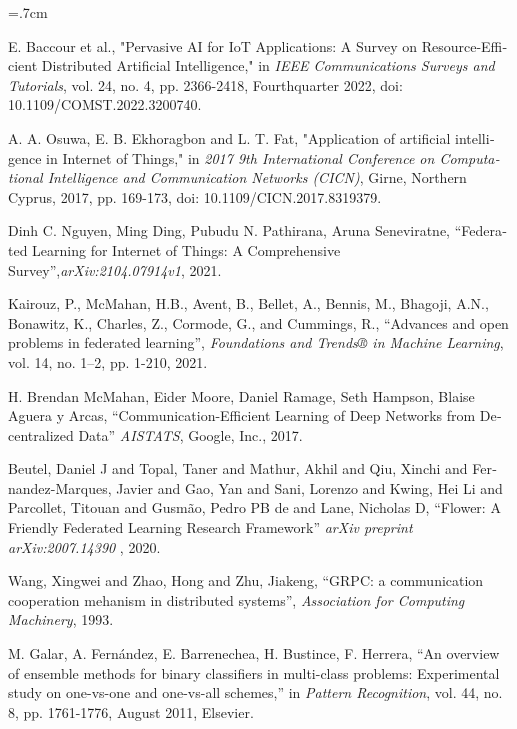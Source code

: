\renewcommand{\bibname}{مراجع}

\begin{thebibliography}{99}

\begin{latin}

\baselineskip=.7cm

E. Baccour et al., "Pervasive AI for IoT Applications: A Survey on Resource-Efficient Distributed Artificial Intelligence," in \textit{IEEE Communications Surveys and Tutorials}, vol. 24, no. 4, pp. 2366-2418, Fourthquarter 2022, doi: 10.1109/COMST.2022.3200740.

A. A. Osuwa, E. B. Ekhoragbon and L. T. Fat, "Application of artificial intelligence in Internet of Things," in \textit{2017 9th International Conference on Computational Intelligence and Communication Networks (CICN)}, Girne, Northern Cyprus, 2017, pp. 169-173, doi: 10.1109/CICN.2017.8319379.

Dinh C. Nguyen, Ming Ding, Pubudu N. Pathirana, Aruna Seneviratne, “Federated Learning for Internet of Things:
A Comprehensive Survey”,\textit{arXiv:2104.07914v1}, 2021.

Kairouz, P., McMahan, H.B., Avent, B., Bellet, A., Bennis, M., Bhagoji, A.N., Bonawitz,
K., Charles, Z., Cormode, G., and Cummings, R., “Advances and open problems in federated
learning”, \textit{Foundations and Trends® in Machine Learning}, vol. 14, no. 1–2, pp. 1-210, 2021.

\noindent H. Brendan McMahan, Eider Moore, Daniel Ramage, Seth Hampson, Blaise Aguera y Arcas, “Communication-Efficient Learning of Deep Networks from Decentralized Data” \textit{AISTATS}, Google, Inc., 2017.

Beutel, Daniel J and Topal, Taner and Mathur, Akhil and Qiu, Xinchi and Fernandez-Marques, Javier and Gao, Yan and Sani, Lorenzo and Kwing, Hei Li and Parcollet, Titouan and Gusmão, Pedro PB de and Lane, Nicholas D, “Flower: A Friendly Federated Learning Research Framework” \textit{arXiv preprint arXiv:2007.14390}
, 2020.

Wang, Xingwei and Zhao, Hong and Zhu, Jiakeng, “GRPC: a communication cooperation mehanism in distributed systems”,  \textit{Association for Computing Machinery}, 1993.

M. Galar, A. Fernández, E. Barrenechea, H. Bustince, F. Herrera, “An overview of ensemble methods for binary classifiers in multi-class problems: Experimental study on one-vs-one and one-vs-all schemes,” in \textit{Pattern Recognition}, vol. 44, no. 8, pp. 1761-1776, August 2011, Elsevier.


\end{latin}
\end{thebibliography}
